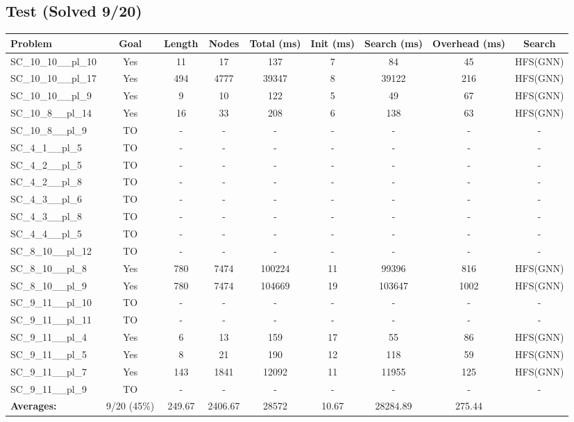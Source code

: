 \documentclass{article}
\begin{document}
\subsection*{Test (Solved 9/20)}
\begin{tabular}{lcccccccc}
\toprule
Problem & Goal & Length & Nodes & Total (ms) & Init (ms) & Search (ms) & Overhead (ms) & Search \\
\midrule
SC\_10\_10\_\_pl\_10 & Yes & 11 & 17 & 137 & 7 & 84 & 45 & HFS(GNN) \\
SC\_10\_10\_\_pl\_17 & Yes & 494 & 4777 & 39347 & 8 & 39122 & 216 & HFS(GNN) \\
SC\_10\_10\_\_pl\_9 & Yes & 9 & 10 & 122 & 5 & 49 & 67 & HFS(GNN) \\
SC\_10\_8\_\_pl\_14 & Yes & 16 & 33 & 208 & 6 & 138 & 63 & HFS(GNN) \\
SC\_10\_8\_\_pl\_9 & TO & - & - & - & - & - & - & - \\
SC\_4\_1\_\_pl\_5 & TO & - & - & - & - & - & - & - \\
SC\_4\_2\_\_pl\_5 & TO & - & - & - & - & - & - & - \\
SC\_4\_2\_\_pl\_8 & TO & - & - & - & - & - & - & - \\
SC\_4\_3\_\_pl\_6 & TO & - & - & - & - & - & - & - \\
SC\_4\_3\_\_pl\_8 & TO & - & - & - & - & - & - & - \\
SC\_4\_4\_\_pl\_5 & TO & - & - & - & - & - & - & - \\
SC\_8\_10\_\_pl\_12 & TO & - & - & - & - & - & - & - \\
SC\_8\_10\_\_pl\_8 & Yes & 780 & 7474 & 100224 & 11 & 99396 & 816 & HFS(GNN) \\
SC\_8\_10\_\_pl\_9 & Yes & 780 & 7474 & 104669 & 19 & 103647 & 1002 & HFS(GNN) \\
SC\_9\_11\_\_pl\_10 & TO & - & - & - & - & - & - & - \\
SC\_9\_11\_\_pl\_11 & TO & - & - & - & - & - & - & - \\
SC\_9\_11\_\_pl\_4 & Yes & 6 & 13 & 159 & 17 & 55 & 86 & HFS(GNN) \\
SC\_9\_11\_\_pl\_5 & Yes & 8 & 21 & 190 & 12 & 118 & 59 & HFS(GNN) \\
SC\_9\_11\_\_pl\_7 & Yes & 143 & 1841 & 12092 & 11 & 11955 & 125 & HFS(GNN) \\
SC\_9\_11\_\_pl\_9 & TO & - & - & - & - & - & - & - \\
\textbf{Averages:} & 9/20 (45\%) & 249.67 & 2406.67 & 28572 & 10.67 & 28284.89 & 275.44 & \\
\bottomrule
\end{tabular}
\\[0.7cm]
\end{document}
